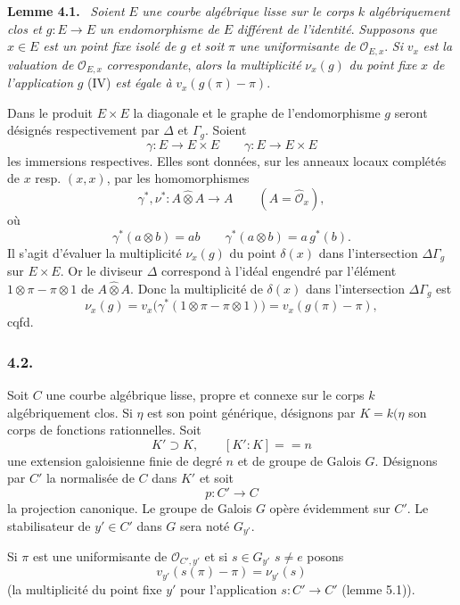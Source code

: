 \documentclass[11pt]{article}
\newenvironment{statement}[1]{\par\medskip\noindent\textbf{#1.}\ }{\par\medskip}
\begin{document}
\begin{statement}{Lemme 4.1}
\emph{Soient} $E$ \emph{une courbe algébrique lisse sur le corps} $k$ \emph{algébriquement clos et} $g:E\to E$ \emph{un endomorphisme de} $E$ \emph{différent de l'identité}. \emph{Supposons que} $x\in E$ \emph{est un point fixe isolé de} $g$ \emph{et soit} $\pi$ \emph{une uniformisante de} $\mathcal O_{E,x}$. \emph{Si} $v_x$ \emph{est la valuation de} $\mathcal O_{E,x}$ \emph{correspondante}, \emph{alors la multiplicité} $\nu_x(g)$ \emph{du point fixe} $x$ \emph{de l'application} $g$ (IV) \emph{est égale à} $v_x(g(\pi)-\pi)$.
\end{statement}


Dans le produit $E\times E$ la diagonale et le graphe de l'endomorphisme $g$ seront désignés respectivement par $\Delta$ et $\Gamma_g$. Soient
\[
\gamma:E\longrightarrow E\times E\qquad
\gamma:E\longrightarrow E\times E
\]
les immersions respectives. Elles sont données, sur les anneaux locaux complétés de $x$ resp. $(x,x)$, par les homomorphismes
\[
\gamma^*,\nu^*:A\widehat\otimes A\longrightarrow A
\qquad (A=\widehat{\mathcal O}_x),
\]
où
\[
\gamma^*(a\otimes b)=ab\qquad
\gamma^*(a\otimes b)=a\,g^*(b).
\]
Il s'agit d'évaluer la multiplicité $\nu_x(g)$ du point $\delta(x)$ dans l'intersection $\Delta\Gamma_g$ sur $E\times E$. Or le diviseur $\Delta$ correspond à l'idéal engendré par l'élément $1\otimes\pi-\pi\otimes1$ de $A\widehat\otimes A$. Donc la multiplicité de $\delta(x)$ dans l'intersection $\Delta\Gamma_g$ est
\[
\nu_x(g)=v_x\bigl(\gamma^*(1\otimes\pi-\pi\otimes1)\bigr)
      =v_x(g(\pi)-\pi),
\]
cqfd.

\subsubsection*{4.2.}

Soit $C$ une courbe algébrique lisse, propre et connexe sur le corps $k$ algébriquement clos. Si $\eta$ est son point générique, désignons par $K=k(\eta$ son corps de fonctions rationnelles.
Soit
\[
K'\supset K,\qquad [K':K]==n
\]
une extension galoisienne finie de degré $n$ et de groupe de Galois $G$. Désignons par $C'$ la normalisée de $C$ dans $K'$ et soit
\[
p:C'\longrightarrow C
\]
la
projection canonique. Le groupe de Galois $G$ opère évidemment sur $C'$. Le stabilisateur de $y'\in C'$ dans $G$ sera noté $G_{y'}$.

Si $\pi$ est une uniformisante de $\mathcal O_{C',y'}$ et si $s\in G_{y'}$ $s\ne e$ posons
\[
v_{y'}(s(\pi)-\pi)=\nu_{y'}(s)
\tag{4.2.1}
\]
(la multiplicité du point fixe $y'$ pour l'application $s:C'\to C'$ (lemme 5.1)).%
\end{document}
